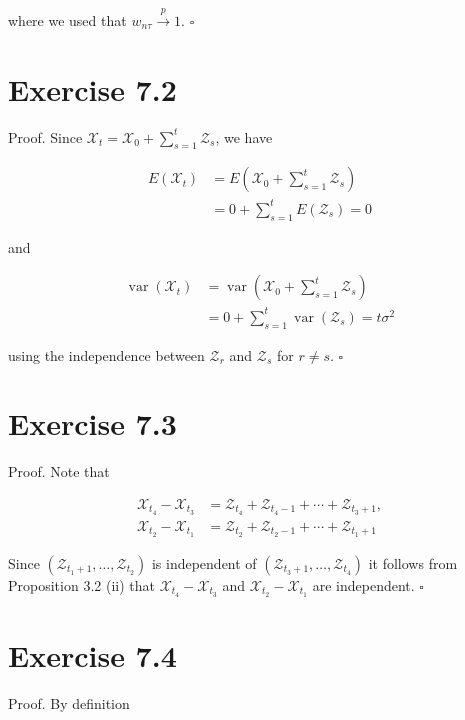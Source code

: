 \documentclass[10pt]{article}
\begin{document}
where we used that $w_{n \tau} \xrightarrow{p} 1$. \(\square\)

\section*{Exercise 7.2}
Proof. Since $\mathcal{X}_{t}=\mathcal{X}_{0}+\sum_{s=1}^{t} \mathcal{Z}_{s}$, we have

$$
\begin{aligned}
E\left(\mathcal{X}_{t}\right) & =E\left(\mathcal{X}_{0}+\sum_{s=1}^{t} \mathcal{Z}_{s}\right) \\
& =0+\sum_{s=1}^{t} E\left(\mathcal{Z}_{s}\right)=0
\end{aligned}
$$

and

$$
\begin{aligned}
\operatorname{var}\left(\mathcal{X}_{t}\right) & =\operatorname{var}\left(\mathcal{X}_{0}+\sum_{s=1}^{t} \mathcal{Z}_{s}\right) \\
& =0+\sum_{s=1}^{t} \operatorname{var}\left(\mathcal{Z}_{s}\right)=t \sigma^{2}
\end{aligned}
$$

using the independence between $\mathcal{Z}_{r}$ and $\mathcal{Z}_{s}$ for $r \neq s$. \(\square\)

\section*{Exercise 7.3}
Proof. Note that

$$
\begin{aligned}
\mathcal{X}_{t_{4}}-\mathcal{X}_{t_{3}} & =\mathcal{Z}_{t_{4}}+\mathcal{Z}_{t_{4}-1}+\cdots+\mathcal{Z}_{t_{3}+1}, \\
\mathcal{X}_{t_{2}}-\mathcal{X}_{t_{1}} & =\mathcal{Z}_{t_{2}}+\mathcal{Z}_{t_{2}-1}+\cdots+\mathcal{Z}_{t_{1}+1}
\end{aligned}
$$

Since $\left(\mathcal{Z}_{t_{1}+1}, \ldots, \mathcal{Z}_{t_{2}}\right)$ is independent of $\left(\mathcal{Z}_{t_{3}+1}, \ldots, \mathcal{Z}_{t_{4}}\right)$ it follows from Proposition 3.2 (ii) that $\mathcal{X}_{t_{4}}-\mathcal{X}_{t_{3}}$ and $\mathcal{X}_{t_{2}}-\mathcal{X}_{t_{1}}$ are independent. \(\square\)

\section*{Exercise 7.4}
Proof. By definition
\end{document}
